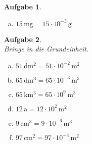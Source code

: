 \documentclass[12pt,fleqn]{article}
\theoremstyle{aufg}
\newtheorem{aufgabe}{Aufgabe}
\theoremstyle{bsp}
\begin{document}
\begin{flushleft}
\begin{aufgabe}
\begin{multicols}{3}
\begin{enumerate}[a)]
\item 
$15\,\mathrm{mg}=15\cdot 10^{-3} \,\mathrm{g^{}}$
\end{enumerate} 
\end{multicols} 
\end{aufgabe} 
\begin{aufgabe} ~ \\ 
Bringe in die Grundeinheit. \\ 
\begin{multicols}{3} 
\begin{enumerate}[a)] 
\item 
$51\,\mathrm{dm^2}=51\cdot 10^{-2} \,\mathrm{m^{2}}$
\item 
$65\,\mathrm{dm^3}=65\cdot 10^{-3} \,\mathrm{m^{3}}$
\item 
$65\,\mathrm{km^3}=65\cdot 10^{9} \,\mathrm{m^{3}}$
\item 
$12\,\mathrm{a}=12\cdot 10^{2} \,\mathrm{m^2} $
\item 
$9\,\mathrm{cm^3}=9\cdot 10^{-6} \,\mathrm{m^{3}}$
\item 
$97\,\mathrm{cm^2}=97\cdot 10^{-4} \,\mathrm{m^{2}}$
\end{enumerate} 
\end{multicols} 
\end{aufgabe} 
\end{flushleft} 
\end{document}
